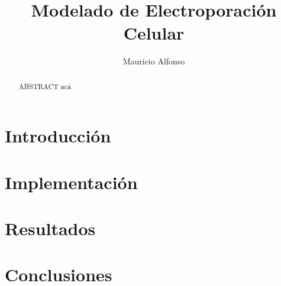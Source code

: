 \documentclass[a4paper,10pt]{article}
\title{Modelado de Electroporación Celular}
\author{Mauricio Alfonso}
\begin{document}
\newcommand{\h}{\ce{H^+}}
\newcommand{\oh}{\ce{OH^-}}
\newcommand{\na}{\ce{Na^+}}
\newcommand{\cl}{\ce{Cl^-}}
\newcommand{\kvm}{$\si{\kilo\volt\per\metre}$}
\newcommand{\usec}{$\si{\micro\second}$}

\maketitle


\begin{abstract}
	ABSTRACT acá
\end{abstract}

\section{Introducción}

\section{Implementación}

\section{Resultados}

\section{Conclusiones}

\begin{thebibliography}{9}


%
%
%
%
%

\end{thebibliography}
\end{document}
